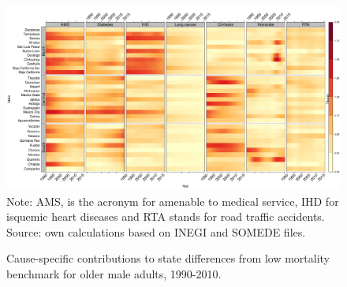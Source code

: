 \documentclass[11.5pt]{article}
\begin{document}
\begin{figure}[h!]
\centering
\caption{Cause-specific contributions to state differences from low mortality benchmark for older male adults, 1990-2010.}
\label{fig:e40_74_males}
\includegraphics[scale=.31]{Adult_Male_heatmap.pdf}
Note: AMS, is the acronym for amenable to medical service, IHD for isquemic heart diseases and RTA stands for road traffic accidents. Source: own calculations based on INEGI and SOMEDE files. 
\end{figure}
\end{document}
